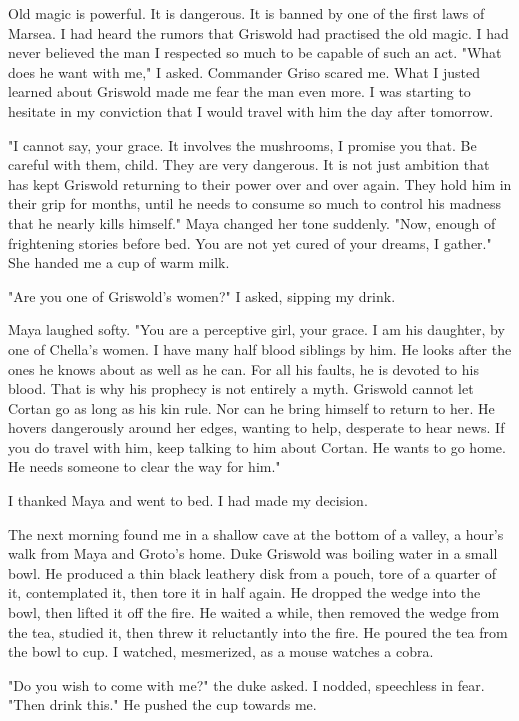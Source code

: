 \documentclass{article}
\begin{document}
Old magic is powerful. It is dangerous. It is banned by one of the first laws of Marsea. I had heard the rumors that Griswold had practised the old magic. I had never believed the man I respected so much to be capable of such an act. "What does he want with me," I asked. Commander Griso scared me. What I justed learned about Griswold made me fear the man even more. I was starting to hesitate in my conviction that I would travel with him the day after tomorrow.

"I cannot say, your grace. It involves the mushrooms, I promise you that. Be careful with them, child. They are very dangerous. It is not just ambition that has kept Griswold returning to their power over and over again. They hold him in their grip for months, until he needs to consume so much to control his madness that he nearly kills himself." Maya changed her tone suddenly. "Now, enough of frightening stories before bed. You are not yet cured of your dreams, I gather." She handed me a cup of warm milk.

"Are you one of Griswold's women?" I asked, sipping my drink.

Maya laughed softy. "You are a perceptive girl, your grace. I am his daughter, by one of Chella's women. I have many half blood siblings by him. He looks after the ones he knows about as well as he can. For all his faults, he is devoted to his blood. That is why his prophecy is not entirely a myth. Griswold cannot let Cortan go as long as his kin rule. Nor can he bring himself to return to her. He hovers dangerously around her edges, wanting to help, desperate to hear news. If you do travel with him, keep talking to him about Cortan. He wants to go home. He needs someone to clear the way for him."

I thanked Maya and went to bed. I had made my decision.

The next morning found me in a shallow cave at the bottom of a valley, a hour's walk from Maya and Groto's home. Duke Griswold was boiling water in a small bowl. He produced a thin black leathery disk from a pouch, tore of a quarter of it, contemplated it, then tore it in half again. He dropped the wedge into the bowl, then lifted it off the fire. He waited a while, then removed the wedge from the tea, studied it, then threw it reluctantly into the fire. He poured the tea from the bowl to cup. I watched, mesmerized, as a mouse watches a cobra. 

"Do you wish to come with me?" the duke asked. I nodded, speechless in fear. "Then drink this." He pushed the cup towards me.
\end{document}
